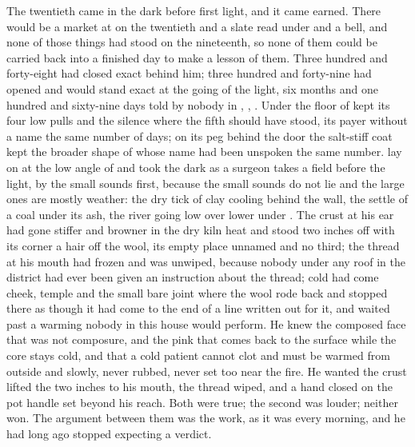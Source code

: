 
The twentieth came in the dark before first light, and it came earned. There would be a market at  on the twentieth and a slate read under  and a bell, and none of those things had stood on the nineteenth, so none of them could be carried back into a finished day to make a lesson of them. Three hundred and forty-eight had closed exact behind him; three hundred and forty-nine had opened and would stand exact at the going of the light, six months and one hundred and sixty-nine days told by nobody in , , . Under the floor of   kept its four low pulls and the silence where the fifth should have stood, its payer without a name the same number of days; on its peg behind the door the salt-stiff coat kept the broader shape of  whose name had been unspoken the same number.  lay on  at the low angle of  and took the dark as a surgeon takes a field before the light, by the small sounds first, because the small sounds do not lie and the large ones are mostly weather: the dry tick of clay cooling behind the wall, the settle of a coal under its ash, the river going low over lower under . The crust at his ear had gone stiffer and browner in the dry kiln heat and stood two inches off with its corner a hair off the wool, its empty place unnamed and no third; the thread at his mouth had frozen and was unwiped, because nobody under any roof in the district had ever been given an instruction about the thread; cold had come cheek, temple and the small bare joint where the wool rode back and stopped there as though it had come to the end of a line written out for it, and  waited past a warming nobody in this house would perform. He knew the composed face that was not composure, and the pink that comes back to the surface while the core stays cold, and that a cold patient cannot clot and must be warmed from outside and slowly, never rubbed, never set too near the fire. He wanted the crust lifted the two inches to his mouth, the thread wiped, and a hand closed on the pot handle set beyond his reach. Both were true; the second was louder; neither won. The argument between them was the work, as it was every morning, and he had long ago stopped expecting a verdict.


